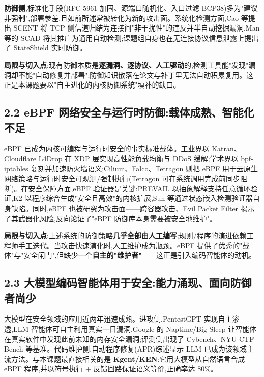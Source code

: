 \textbf{防御侧},标准化手段(RFC 5961 加固\supercite{rfc5961}、源端口随机化\supercite{rfc6056}、入口过滤 BCP38\supercite{rfc2827})多为"建议非强制",部署参差,且如前所述常被转化为新的攻击面。系统化检测方面,Cao 等提出 SCENT 将 TCP 侧信道归结为连接间"非干扰性"的违反并半自动挖掘漏洞\supercite{cao2019scent},Man 等的 SCAD 将其推广为通用自动检测\supercite{man2024scad};课题组自身也在无连接协议信息泄露上提出了 StateShield 实时防御\supercite{li2025stateshield}。

\textbf{局限与切入点}:现有防御本质是\textbf{逐漏洞、逐协议、人工驱动}的;检测工具能"发现"漏洞却不能"自动修复并部署";防御知识散落在论文与补丁里无法自动积累复用。这正是本课题要以"自主进化的内核防御系统"填补的缺口。

\subsection*{2.2 eBPF 网络安全与运行时防御:载体成熟、智能化不足}
eBPF 已成为内核可编程与运行时安全的事实标准载体。工业界以 Katran\supercite{shirokov2018katran}、Cloudflare L4Drop\supercite{fabre2018l4drop} 在 XDP 层实现高性能负载均衡与 DDoS 缓解;学术界以 bpf-iptables\supercite{miano2019bpfiptables} 复刻并加速防火墙语义;Cilium\supercite{graf2020cilium}、Falco\supercite{falco2018}、Tetragon\supercite{tetragon2022} 则把 eBPF 用于云原生网络策略与运行时安全可观测/强制执行(Tetragon 可在系统调用完成前同步阻断)。在安全保障方面,eBPF 验证器是关键:PREVAIL 以抽象解释支持任意循环验证\supercite{gershuni2019prevail},K2 以程序综合生成"安全且高效"的内核扩展\supercite{xu2021k2},Sun 等通过状态嵌入检测验证器自身缺陷\supercite{sun2024stateembedding}。同时,eBPF 也被研究为攻击面——跨容器攻击\supercite{he2023crosscontainer}、Evil Packet Filter\supercite{jin2023epf} 揭示了其武器化风险,反向论证了"eBPF 防御库本身需要被安全地维护"。

\textbf{局限与切入点}:上述系统的防御策略\textbf{几乎全部由人工编写};规则/程序的演进依赖工程师手工迭代。当攻击快速演化时,人工维护成为瓶颈。eBPF 提供了优秀的"载体"与"安全闸门",但缺少一个\textbf{自主的"维护者"}——这正是引入编码智能体的动机。

\subsection*{2.3 大模型编码智能体用于安全:能力涌现、面向防御者尚少}
大模型在安全领域的应用近两年迅速成熟。进攻侧,PentestGPT 实现自主渗透\supercite{deng2024pentestgpt},LLM 智能体可自主利用真实一日漏洞\supercite{fang2024oneday},Google 的 Naptime/Big Sleep 让智能体在真实软件中发现此前未知的内存安全漏洞\supercite{glazunov2024naptime};评测侧出现了 Cybench\supercite{zhang2025cybench}、NYU CTF Bench\supercite{shao2024nyuctf} 等基准。代码维护侧,自动程序修复(APR)综述显示 LLM 已成为该领域主流方法\supercite{zhang2024aprsurvey}。与本课题最直接相关的是 \textbf{Kgent/KEN}:它用大模型从自然语言合成 eBPF 程序,并以符号执行 + 反馈回路保证语义等价,正确率达 80\%\supercite{yang2024kgent}。

